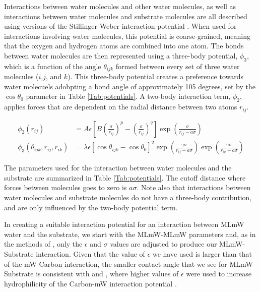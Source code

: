 \documentclass[journal abbreviation, manuscript]{copernicus}
\begin{document}
Interactions between water molecules and other water molecules, as well as interactions between water molecules and substrate molecules are all described using versions of the Stillinger-Weber interaction potential \citep{stillinger1985computer}. When used for interactions involving water molecules, this potential is coarse-grained, meaning that the oxygen and hydrogen atoms are combined into one atom. The bonds between water molecules are then represented using a three-body potential, $\phi_{3}$, which is a function of the angle $\theta_{ijk}$ formed between every set of three water molecules ($i$,$j$, and $k$). This three-body potential creates a preference towards water molecuels adobpting a bond angle of approximately 105 degrees, set by the $\cos\theta_0$ parameter in Table \ref{Tab:potentials}. A two-body interaction term, $\phi_{2}$, applies forces that are dependent on the radial distance between two atoms $r_{ij}$.

\begin{align}\label{eq:sw-potential}
\phi_{2}(r_{ij}) &= A\epsilon\left[B(\frac{\sigma}{r_{ij}})^{p} - (\frac{\sigma}{r_{ij}})^{q}\right]\exp \left( \frac{\sigma}{r_{ij}-a\sigma}\right)\\
\phi_{3}(\theta_{ijk}, r_{ij}, r_{ik}) &= \lambda\epsilon[\cos\theta_{ijk} - \cos\theta_0]^2 \exp \left(\frac{\gamma\sigma}{r_{ij}-a\sigma}\right) \exp \left(\frac{\gamma\sigma}{r_{ik}-a\sigma}\right)
\end{align}

The parameters used for the interaction between water molecules and the substrate are summarized in Table \ref{Tab:potentials}. The cutoff distance where forces between molecules goes to zero is $a\sigma$. Note also that interactions between water molecules and substrate molecules do not have a three-body contribution, and are only influenced by the two-body potential term.

In creating a suitable interaction potential for an interaction between MLmW water and the substrate, we start with the MLmW-MLmW parameters and, as in the methods of \citet{fitzner2015facets}, only the $\epsilon$ and $\sigma$ values are adjusted to produce our MLmW-Substrate interaction. Given that the value of $\epsilon$ we have used is larger than that of the mW-Carbon interaction, the smaller contact angle that we see for MLmW-Substrate is consistent with \citet{Bi2016} and \citet{cox2015hydrophilicity}, where higher values of $\epsilon$ were used to increase hydrophilicity of the Carbon-mW interaction potential \cite{Bi2016}.
\end{document}
